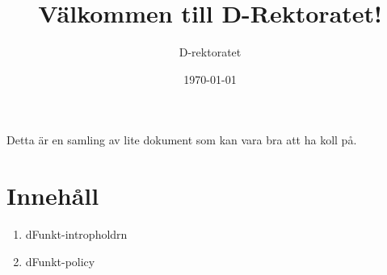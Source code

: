 \documentclass[a4paper,11pt]{article}
\title{Välkommen till D-Rektoratet!}
\author{D-rektoratet}
\date{\today}
\begin{document}
\maketitle

Detta är en samling av lite dokument som kan vara bra
att ha koll på.


\section*{Innehåll}

\begin{enumerate}
\item dFunkt-intropholdrn
\item dFunkt-policy
\end{enumerate}

\pagebreak




\end{document}
